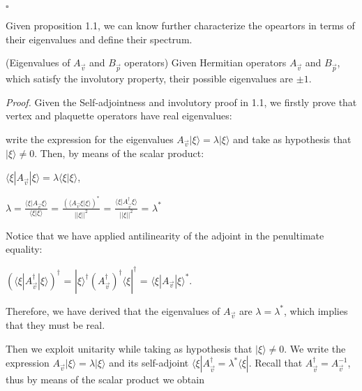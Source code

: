 \documentclass{Configuration_Files/PoliMi3i_thesis}
\begin{document}
\hfill $\square$

Given proposition 1.1, we can know further characterize the opeartors in terms of their eigenvalues and define their spectrum.

\begin{proposition} (Eigenvalues of $A_{\vec{v}}$ and $B_{\vec{p}}$ operators) Given Hermitian operators $A_{\vec{v}}$ and $B_{\vec{p}}$, which satisfy the involutory property, their possible eigenvalues are $\pm 1$.
\end{proposition}


\textit{Proof.}\newline
Given the Self-adjointness and involutory proof in 1.1, we firstly prove that vertex and plaquette operators have real eigenvalues: 

write the expression for the eigenvalues $A_{\vec{v}} |\xi \rangle = \lambda |\xi \rangle$ and take as hypothesis that $|\xi \rangle \neq 0$. Then, by means of the scalar product:

\begin{center}
	$\langle \xi|A_{\vec{v}}|\xi \rangle = \lambda \langle \xi | \xi \rangle$,
	
	$\lambda = \frac {\langle \xi|A_{\vec{v}}\xi \rangle}{\langle \xi |\xi \rangle}$ = $\frac {(\langle A_{\vec{v}}\xi|\xi \rangle)^*}{||\xi||^2}$ = $\frac {\langle \xi|A_{\vec{v}}^{\dagger}\xi \rangle}{||\xi||^2}$ = $\lambda^*$ 
\end{center}

Notice that we have applied antilinearity of the adjoint in the penultimate equality: 

\begin{center}
	$(\langle \xi|A_{\vec{v}}^{\dagger}|\xi \rangle)^{\dagger}$ = $|\xi\rangle^{\dagger} (A_{\vec{v}}^{\dagger})^{\dagger} \langle\xi|^{\dagger}$ = $\langle \xi|A_{\vec{v}}|\xi \rangle^*$.  
\end{center}

Therefore, we have derived that the eigenvalues of $A_{\vec{v}}$ are $\lambda = \lambda^*$, which implies that they must be real.


Then we exploit unitarity while taking as hypothesis that $|\xi \rangle \neq 0$. 
We write the expression $A_{\vec{v}} |\xi \rangle = \lambda |\xi \rangle$ and its self-adjoint $\langle \xi| A_{\vec{v}}^{\dagger} = \lambda^* \langle \xi|$. Recall that $A_{\vec{v}}^{\dagger}=A_{\vec{v}}^{-1}$, thus by means of the scalar product we obtain 
\end{document}
